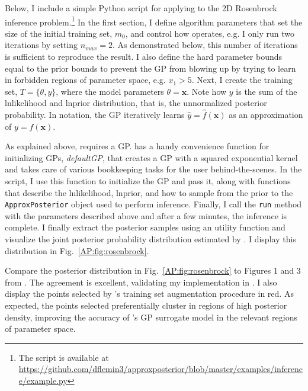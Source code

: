 Below, I include a simple Python script for applying \approxposterior to the 2D Rosenbrock inference problem.\footnote{The script is available at \href{https://github.com/dflemin3/approxposterior/blob/master/examples/inference/example.py}{https://github.com/dflemin3/approxposterior/blob/master/examples/inference/example.py}} In the first section, I define algorithm parameters that set the size of the initial training set, $m_0$, and control how \approxposterior operates, e.g. I only run two iterations by setting $n_{max} = 2$. As demonstrated below, this number of iterations is sufficient to reproduce the \citet{Wang2018} result. I also define the hard parameter bounds equal to the prior bounds to prevent the GP from blowing up by trying to learn in forbidden regions of parameter space, e.g. $x_1 > 5$. Next, I create the training set, $T = \{ \theta, y \}$, where the model parameters $\theta = \textbf{x}$. Note how $y$ is the sum of the lnlikelihood and lnprior distribution, that is, the unnormalized posterior probability. In \approxposterior notation, the GP iteratively learns $\hat{y} = \hat{f}(\textbf{x})$ as an approximation of $y = f(\textbf{x})$.

As explained above, \approxposterior requires a GP. \approxposterior has a handy convenience function for initializing GPs, \textit{defaultGP}, that creates a GP with a squared exponential kernel and takes care of various bookkeeping tasks for the user behind-the-scenes. In the script, I use this function to initialize the GP and pass it, along with functions that describe the lnlikelihood, lnprior, and how to sample from the prior to the \texttt{ApproxPosterior} object used to perform inference. Finally, I call the \approxposterior \texttt{run} method with the parameters described above and after a few minutes, the inference is complete. I finally extract the posterior samples using an \emcee utility function and visualize the joint posterior probability distribution estimated by \approxposterior. I display this distribution in Fig.~\ref{AP:fig:rosenbrock}. 


Compare the posterior distribution in Fig.~\ref{AP:fig:rosenbrock} to Figures 1 and 3 from \citet{Wang2018}. The agreement is excellent, validating my implementation in \approxposterior. I also display the points selected by \approxposterior's training set augmentation procedure in red. As expected, the points \approxposterior selected preferentially cluster in regions of high posterior density, improving the accuracy of \approxposterior's GP surrogate model in the relevant regions of parameter space.

